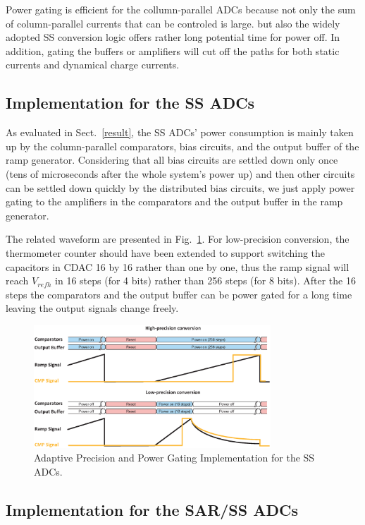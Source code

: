 \documentclass[conference]{IEEEtran}
\begin{document}
Power gating is efficient for the collumn-parallel ADCs because not only the sum of column-parallel currents that can be controled is large.
but also the widely adopted SS conversion logic offers rather long potential time for power off.
In addition, gating the buffers or amplifiers will cut off the paths for both static currents and dynamical charge currents. 

\subsection{Implementation for the SS ADCs}

As evaluated in Sect.~\ref{result}, the SS ADCs’ power consumption is mainly taken up by the column-parallel comparators, bias circuits, and the output buffer of the ramp generator. 
Considering that all bias circuits are settled down only once (tens of microseconds after the whole system's power up) and then other circuits can be settled down quickly by the distributed 
bias circuits, we just apply power gating to the amplifiers in the comparators and the output buffer in the ramp generator.

The related waveform are presented in Fig.~\ref{SS_pg}. For low-precision conversion, the thermometer counter should have been extended to support switching the capacitors in CDAC 16 by 16 
rather than one by one, thus the ramp signal will reach $V_{refh}$ in 16 steps (for 4 bits) rather than 256 steps (for 8 bits). After the 16 steps the comparators and the output buffer 
can be power gated for a long time leaving the output signals change freely.

\begin{figure}[htbp]
	\centerline{\includegraphics[width=3.5in]{./Figures/SS_pg.eps}}
	\caption{Adaptive Precision and Power Gating Implementation for the SS ADCs.}
	\label{SS_pg}
\end{figure} 

\subsection{Implementation for the SAR/SS ADCs}
\end{document}
